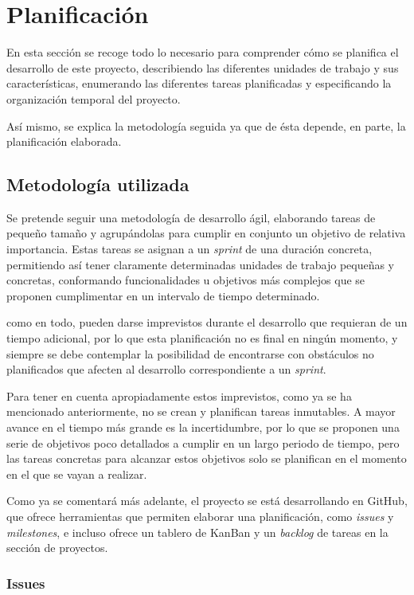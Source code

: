 \chapter{Planificación}

En esta sección se recoge todo lo necesario para comprender cómo se planifica el desarrollo de este proyecto, describiendo las diferentes unidades de trabajo y sus características, enumerando las diferentes tareas planificadas y especificando la organización temporal del proyecto.

Así mismo, se explica la metodología seguida ya que de ésta depende, en parte, la planificación elaborada.

\section{Metodología utilizada}

Se pretende seguir una metodología de desarrollo ágil, elaborando tareas de pequeño tamaño y agrupándolas para cumplir en conjunto un objetivo de relativa importancia. Estas tareas se asignan a un \textit{sprint} de una duración concreta, permitiendo así tener claramente determinadas unidades de trabajo pequeñas y concretas, conformando funcionalidades u objetivos más complejos que se proponen cumplimentar en un intervalo de tiempo determinado.

 como en todo, pueden darse imprevistos durante el desarrollo que requieran de un tiempo adicional, por lo que esta planificación no es final en ningún momento, y siempre se debe contemplar la posibilidad de encontrarse con obstáculos no planificados que afecten al desarrollo correspondiente a un \textit{sprint}.

Para tener en cuenta apropiadamente estos imprevistos, como ya se ha mencionado anteriormente, no se crean y planifican tareas inmutables. A mayor avance en el tiempo más grande es la incertidumbre, por lo que se proponen una serie de objetivos poco detallados a cumplir en un largo periodo de tiempo, pero las tareas concretas para alcanzar estos objetivos solo se planifican en el momento en el que se vayan a realizar.

Como ya se comentará más adelante, el proyecto se está desarrollando en GitHub\cite{Github}, que ofrece herramientas que permiten elaborar una planificación, como \textit{issues} y \textit{milestones}, e incluso ofrece un tablero de KanBan y un \textit{backlog} de tareas en la sección de proyectos.

\subsection{Issues}

